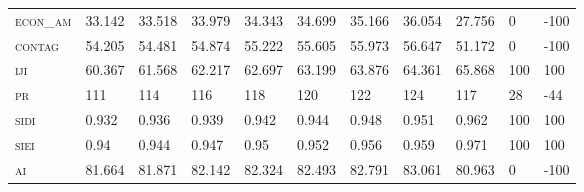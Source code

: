 \begin{landscape}
\begin{table}[!htbp]
\begin{tabular}{@{}lllllllllll@{}}
\small \textsc{econ\_am}        & 33.142          & 33.518          & 33.979           & 34.343           & 34.699           & 35.166           & 36.054            & 27.756        & 0                                                                & -100                                                               \\
\small \textsc{contag}          & 54.205          & 54.481          & 54.874           & 55.222           & 55.605           & 55.973           & 56.647            & 51.172        & 0                                                                & -100                                                               \\
\small \textsc{iji }            & 60.367          & 61.568          & 62.217           & 62.697           & 63.199           & 63.876           & 64.361            & 65.868        & 100                                                              & 100                                                                \\
\small \textsc{pr}              & 111             & 114             & 116              & 118              & 120              & 122              & 124               & 117           & 28                                                               & -44                                                                \\
\small \textsc{sidi}            & 0.932           & 0.936           & 0.939            & 0.942            & 0.944            & 0.948            & 0.951             & 0.962         & 100                                                              & 100                                                                \\
\small \textsc{siei}            & 0.94            & 0.944           & 0.947            & 0.95             & 0.952            & 0.956            & 0.959             & 0.971         & 100                                                              & 100                                                                \\
\small \textsc{ai}              & 81.664          & 81.871          & 82.142           & 82.324           & 82.493           & 82.791           & 83.061            & 80.963        & 0                                                                & -100                                                               \\ \bottomrule
\end{tabular}
\end{table}
\end{landscape}


